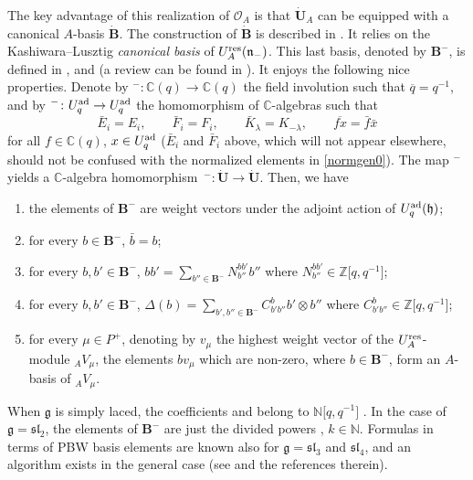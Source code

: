 \documentclass[pdftex]{sigma}
\numberwithin{equation}{section}
\theoremstyle{definition}
\newcommand{\mc}{\mathbb{C}}
\newcommand{\mz}{\mathbb{Z}}
\newcommand{\mn}{\mathbb{N}}
\newcommand{\Oo}{{\mathcal O}}
\newcommand{\ra}{\rightarrow}
\begin{document}
The key advantage of this realization of $\Oo_A$ is that $\dot{\mathbf{U}}_A$ can be equipped with a canonical $A$-basis $\dot{\mathbf{B}}$. The construction of $\dot{\mathbf{B}}$ is described in \cite[Chapter~25]{Lusztig}. It relies on the Kashiwara--Lusztig {\it canonical basis} of $U_A^{\rm res}(\mathfrak{n}_-)$. This last basis, denoted by $\mathbf{B}^-$, is defined in \cite[Chapter~14]{Lusztig}, and \cite{Kashiwara1} (a review can be found in \cite[Chapter~14]{CP}). It enjoys the following nice properties. Denote by ${}^-\colon \mc(q) \ra \mc(q)$ the field involution such that $\overline{q} = q^{-1}$, and by ${}^-\colon U_q^{\rm ad} \ra U_q^{\rm ad}$ the homomorphism of $\mc$-algebras such that
\[\bar{E}_i = E_i,\qquad \bar{F}_i = F_i,\qquad \bar{K}_\lambda = K_{-\lambda},\qquad \overline{fx} = \bar{f}\bar{x}\]
for all $f\in \mc(q)$, $x\in U_q^{\rm ad}$ ($\bar{E}_i$ and $\bar{F}_i$ above, which will not appear elsewhere, should not be confused with the normalized elements in \eqref{normgen0}). The map ${}^-$ yields a $\mc$-algebra homomorphism~${{}^-\colon \dot{\mathbf{U}} \ra \dot{\mathbf{U}}}$. Then, we have
\begin{enumerate}\itemsep=0pt
\item[(1)] the elements of $\mathbf{B}^-$ are weight vectors under the adjoint action of $U_q^{\rm ad}(\mathfrak{h})$;
\item[(2)] for every $b\in \mathbf{B}^-$, $\bar{b} =b$;
\item[(3)] for every $b,b'\in \mathbf{B}^-$, $bb' = \sum_{b''\in \mathbf{B}^-} N^{bb'}_{b''} b''$ where $N^{bb'}_{b''}\in \mz\big[q,q^{-1}\big]$;
\item[(4)] for every $b,b'\in \mathbf{B}^-$, $\Delta(b) = \sum_{b',b''\in \mathbf{B}^-} C_{b'b''}^b b' \otimes b''$ where $C_{b'b''}^{b}\in \mz\big[q,q^{-1}\big]$;
\item[(5)] for every $\mu\in P^+$, denoting by $v_\mu$ the highest weight vector of the $U_A^{\rm res}$-module ${}_AV_\mu$, the elements $bv_\mu$ which are non-zero, where $b\in \mathbf{B}^-$, form an $A$-basis of ${}_AV_\mu$.
\end{enumerate}
When $\mathfrak{g}$ is simply laced, the coefficients  and  belong to $\mn\big[q,q^{-1}\big]$ \cite[Theorem~14.3.13]{Lusztig}. In the case of $\mathfrak{g}={\mathfrak{sl}_2}$, the elements of $\mathbf{B}^-$ are just the divided powers , $k\in \mn$. Formulas in terms of PBW basis elements are known also for $\mathfrak{g}=\mathfrak{sl}_3$ and $\mathfrak{sl}_4$, and an algorithm exists in the general case (see \cite{deGraaf} and the references therein).
\end{document}
